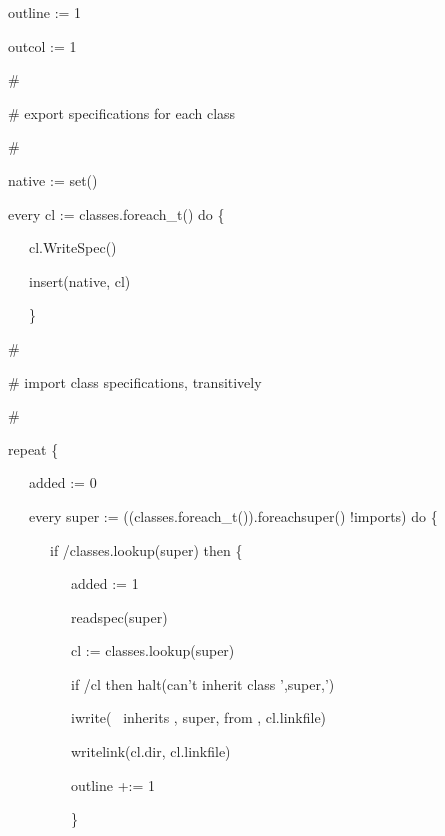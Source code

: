 \bigskip

{\ttfamily\mdseries
\ \ \ outline := 1}

{\ttfamily\mdseries
\ \ \ outcol := 1}

{\ttfamily\mdseries
\ \ \ \#}

{\ttfamily\mdseries
\ \ \ \# export specifications for each class}

{\ttfamily\mdseries
\ \ \ \#}

{\ttfamily\mdseries
\ \ \ native := set()}

{\ttfamily\mdseries
\ \ \ every cl := classes.foreach\_t() do \{}

{\ttfamily\mdseries
\ \ \ \ \ \ cl.WriteSpec()}

{\ttfamily\mdseries
\ \ \ \ \ \ insert(native, cl)}

{\ttfamily\mdseries
\ \ \ \ \ \ \}}

{\ttfamily\mdseries
\ \ \ \#}

{\ttfamily\mdseries
\ \ \ \# import class specifications, transitively}

{\ttfamily\mdseries
\ \ \ \#}

{\ttfamily\mdseries
\ \ \ repeat \{}

{\ttfamily\mdseries
\ \ \ \ \ \ added := 0}

{\ttfamily\mdseries
\ \ \ \ \ \ every super := ((classes.foreach\_t()).foreachsuper() {\textbar} !imports) do \{}

{\ttfamily\mdseries
\ \ \ \ \ \ \ \ \ if /classes.lookup(super) then \{}

{\ttfamily\mdseries
\ \ \ \ \ \ \ \ \ \ \ \ added := 1}

{\ttfamily\mdseries
\ \ \ \ \ \ \ \ \ \ \ \ readspec(super)}

{\ttfamily\mdseries
\ \ \ \ \ \ \ \ \ \ \ \ cl := classes.lookup(super)}

{\ttfamily\mdseries
\ \ \ \ \ \ \ \ \ \ \ \ if /cl then halt({\textquotedbl}can't inherit class
'{\textquotedbl},super,{\textquotedbl}'{\textquotedbl})}

{\ttfamily\mdseries
\ \ \ \ \ \ \ \ \ \ \ \ iwrite({\textquotedbl} \ inherits {\textquotedbl}, super, {\textquotedbl} from {\textquotedbl},
cl.linkfile)}

{\ttfamily\mdseries
\ \ \ \ \ \ \ \ \ \ \ \ writelink(cl.dir, cl.linkfile)}

{\ttfamily\mdseries
\ \ \ \ \ \ \ \ \ \ \ \ outline +:= 1}

{\ttfamily\mdseries
\ \ \ \ \ \ \ \ \ \ \ \ \}}

